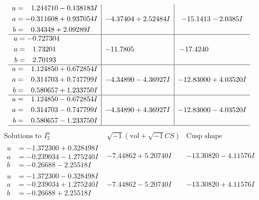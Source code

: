 \documentclass[1p]{elsarticle_modified}
\theoremstyle{definition}
\newcommand{\I}{\sqrt{-1}}
\begin{document}
$$\begin{array}{c|c|c}
\begin{aligned}
u &= \phantom{-}1.244710 - 0.138183 I \\
a &= -0.311608 + 0.937054 I \\
b &= \phantom{-}0.34348 + 2.09289 I\end{aligned}
 & -4.37404 + 2.52484 I & -15.1413 - 2.0385 I \\ \hline\begin{aligned}
u &= -0.727304\phantom{ +0.000000I} \\
a &= \phantom{-}1.73201\phantom{ +0.000000I} \\
b &= \phantom{-}2.70193\phantom{ +0.000000I}\end{aligned}
 & -11.7805\phantom{ +0.000000I} & -17.4240\phantom{ +0.000000I} \\ \hline\begin{aligned}
u &= \phantom{-}1.124850 + 0.672854 I \\
a &= \phantom{-}0.314703 + 0.747799 I \\
b &= \phantom{-}0.580657 + 1.233750 I\end{aligned}
 & -4.34890 - 4.36927 I & -12.83000 + 4.03520 I \\ \hline\begin{aligned}
u &= \phantom{-}1.124850 - 0.672854 I \\
a &= \phantom{-}0.314703 - 0.747799 I \\
b &= \phantom{-}0.580657 - 1.233750 I\end{aligned}
 & -4.34890 + 4.36927 I & -12.83000 - 4.03520 I\\
 \hline 
 \end{array}$$\newpage$$\begin{array}{c|c|c}  
\text{Solutions to }I^u_{2}& \I (\text{vol} + \sqrt{-1}CS) & \text{Cusp shape}\\
 \hline 
\begin{aligned}
u &= -1.372300 + 0.328498 I \\
a &= -0.239034 - 1.275240 I \\
b &= -0.26688 - 2.25518 I\end{aligned}
 & -7.44862 + 5.20740 I & -13.30820 - 4.11576 I \\ \hline\begin{aligned}
u &= -1.372300 - 0.328498 I \\
a &= -0.239034 + 1.275240 I \\
b &= -0.26688 + 2.25518 I\end{aligned}
 & -7.44862 - 5.20740 I & -13.30820 + 4.11576 I \\ \hline\begin{aligned}

\end{aligned}
\end{array}$$
\end{document}
